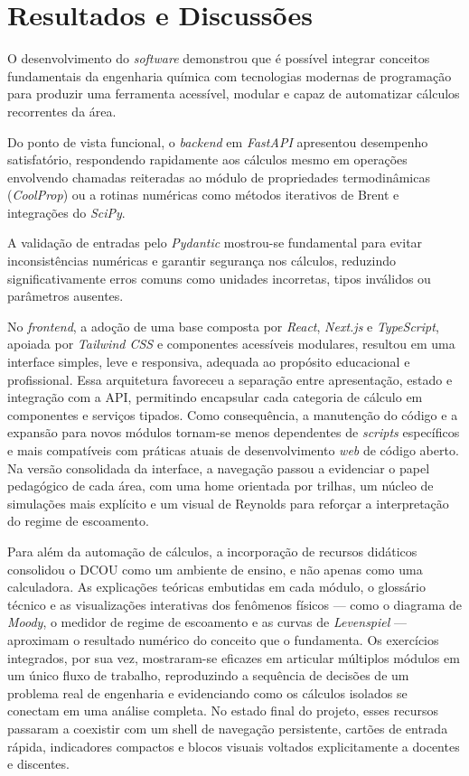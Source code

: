 \chapter{Resultados e Discussões}

O desenvolvimento do \textit{software} demonstrou que é possível integrar conceitos fundamentais da engenharia química com tecnologias modernas de programação para produzir uma ferramenta acessível, modular e capaz de automatizar cálculos recorrentes da área.

Do ponto de vista funcional, o \textit{backend} em \textit{FastAPI} apresentou desempenho satisfatório, respondendo rapidamente aos cálculos mesmo em operações envolvendo chamadas reiteradas ao módulo de propriedades termodinâmicas (\textit{CoolProp}) ou a rotinas numéricas como métodos iterativos de Brent e integrações do \textit{SciPy}.

A validação de entradas pelo \textit{Pydantic} mostrou-se fundamental para evitar inconsistências numéricas e garantir segurança nos cálculos, reduzindo significativamente erros comuns como unidades incorretas, tipos inválidos ou parâmetros ausentes.

No \textit{frontend}, a adoção de uma base composta por \textit{React}, \textit{Next.js} e \textit{TypeScript}, apoiada por \textit{Tailwind CSS} e componentes acessíveis modulares, resultou em uma interface simples, leve e responsiva, adequada ao propósito educacional e profissional. Essa arquitetura favoreceu a separação entre apresentação, estado e integração com a API, permitindo encapsular cada categoria de cálculo em componentes e serviços tipados. Como consequência, a manutenção do código e a expansão para novos módulos tornam-se menos dependentes de \textit{scripts} específicos e mais compatíveis com práticas atuais de desenvolvimento \textit{web} de código aberto. Na versão consolidada da interface, a navegação passou a evidenciar o papel pedagógico de cada área, com uma home orientada por trilhas, um núcleo de simulações mais explícito e um visual de Reynolds para reforçar a interpretação do regime de escoamento.

Para além da automação de cálculos, a incorporação de recursos didáticos consolidou o DCOU como um ambiente de ensino, e não apenas como uma calculadora. As explicações teóricas embutidas em cada módulo, o glossário técnico e as visualizações interativas dos fenômenos físicos --- como o diagrama de \textit{Moody}, o medidor de regime de escoamento e as curvas de \textit{Levenspiel} --- aproximam o resultado numérico do conceito que o fundamenta. Os exercícios integrados, por sua vez, mostraram-se eficazes em articular múltiplos módulos em um único fluxo de trabalho, reproduzindo a sequência de decisões de um problema real de engenharia e evidenciando como os cálculos isolados se conectam em uma análise completa. No estado final do projeto, esses recursos passaram a coexistir com um shell de navegação persistente, cartões de entrada rápida, indicadores compactos e blocos visuais voltados explicitamente a docentes e discentes.


